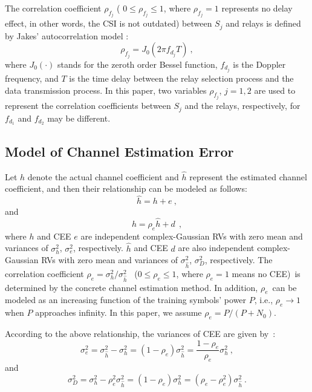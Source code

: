 \documentclass[onecolumn,letterpaper,11pt,draftclsnofoot]{IEEEtran}
\begin{document}
The correlation coefficient $\rho_{f_j}$ ( $0 \le \rho _{f_j } \le
1$, where $\rho_{f_j}=1$ represents no delay effect, in other words,
the CSI is not outdated) between $S_j$ and relays is defined by
Jakes' autocorrelation model \cite{Michalopoulos2010}:
\begin{equation}\label{Eq:rhof}
\rho _{f_j}  = J_0 \left(2\pi f_{d_j} T\right)~,
\end{equation}
where $J_0\left( \cdot \right)$ stands for the zeroth order Bessel
function\cite{Abramowitz}, $f_{d_j}$ is the Doppler frequency, and
$T$ is the time delay between the relay selection process and the
data transmission process. In this paper, two variables
$\rho_{f_j}$, $j=1,2$ are used to represent the correlation
coefficients between $S_j$ and the relays, respectively, for
$f_{d_1}$ and $f_{d_2}$ may be different.

\subsection{Model of Channel Estimation Error}
Let $h$ denote the actual channel coefficient and $\hat h$
represent the estimated channel coefficient, and then their relationship
can be modeled as follows\cite{Seyfi2010}:
\begin{equation}
\hat h = h + e~,\label{Eq:he}
\end{equation}
and
\begin{equation}
h = \rho _e \hat h + d~ \label{Eq:hd}~,
\end{equation}
where $h$ and CEE $e$ are independent complex-Gaussian RVs with zero
mean and variances of $\sigma _h^2$, $\sigma_e^2$, respectively.
$\hat h$ and CEE $d$ are also independent complex-Gaussian RVs with
zero mean and variances of $\sigma_{\hat h}^2$, $\sigma_D^2$,
respectively. The correlation coefficient $ \rho _e  = {\sigma _h^2
}/{ \sigma _{\hat h}^2} $ ~($0 \le \rho_e \le 1$, where $\rho_e =1$
means no CEE)~is determined by the concrete channel estimation
method. In addition, $\rho_e$~can be modeled as an increasing
function of the training symbols' power $P$, i.e., $\rho_e \to 1$
when $P$ approaches infinity\cite{Yoo2006,Feifei2009}. In this
paper, we assume $\rho_e={P}/\left({P+N_0}\right)$\cite{Ramya2009}.

According to the above relationship, the variances of CEE are given
by~:
\begin{equation}\label{Eq:vare}
\sigma _e^2 = \sigma _{\hat h}^2-\sigma _h^2 = \left(1-
\rho_e\right)\sigma _{\hat h}^2 =\frac{1-\rho_e}{\rho_e}\sigma
_h^2~,
\end{equation}
and
\begin{equation}\label{Eq:vard}
\sigma _D^2  = \sigma _h^2  - \rho _e^2 \sigma _{\hat h}^2  = \left(
{1 - \rho _e } \right)\sigma _h^2  = \left( {\rho _e  - \rho _e^2 }
\right)\sigma _{\hat h}^2~.
\end{equation}
\end{document}
